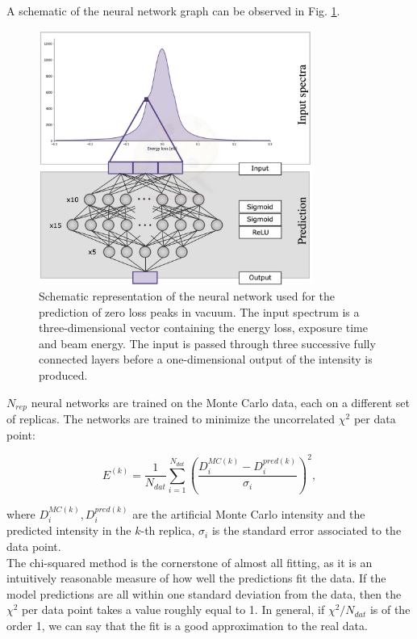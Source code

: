 A schematic of the neural network graph can be observed in Fig. \ref{architecture}. 
\begin{figure}[H]
    \centering
    \includegraphics[width=90mm]{plots/architecture.jpg}
    \caption{Schematic representation of the neural network used for the prediction of zero loss peaks in vacuum. The input spectrum is a three-dimensional vector containing the energy loss, exposure time and beam energy. The input is passed through three successive fully connected layers before a one-dimensional output of the intensity is produced.}
    \label{architecture}
\end{figure}

$N_{rep}$ neural networks are trained on the Monte Carlo data, each on a different set of replicas. The networks are trained to minimize the uncorrelated $\chi^2$ per data point:

\begin{equation} \label{eq:chi2}
    E^{(k)} = \frac{1}{N_{dat}}\sum_{i=1}^{N_{dat}}\left(\frac{D_i^{MC(k)} - D_i^{pred(k)}}{\sigma_i}\right)^2, 
\end{equation}

where $D_i^{MC(k)}, D_i^{pred(k)}$ are the artificial Monte Carlo intensity and the predicted intensity in the $k$-th replica, $\sigma_i$ is the standard error associated to the data point. \\
The chi-squared method is the cornerstone of almost all fitting, as it is an intuitively reasonable measure of how well the predictions fit the data. If the model predictions are all within one standard deviation from the data, then the $\chi^2$ per data point takes a value roughly equal to 1. In general, if $\chi^2/N_{dat}$ is of the order 1, we can say that the fit is a good approximation to the real data. \\

